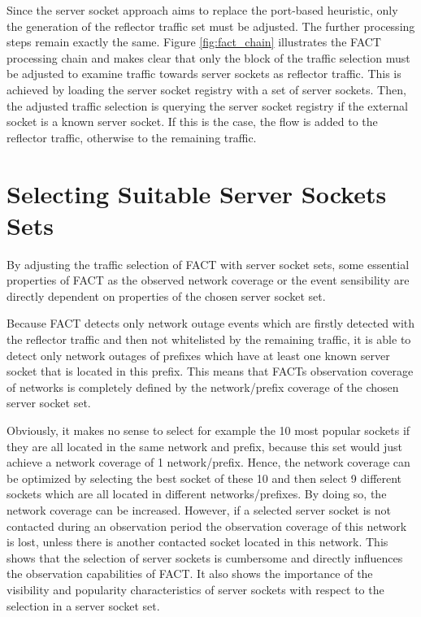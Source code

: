 Since the \gls{server socket} approach aims to replace the port-based heuristic, 
only the generation of the reflector traffic set must be adjusted. The further 
processing steps remain exactly the same. Figure \ref{fig:fact_chain} 
illustrates the \gls{FACT} processing chain and makes clear that only the block 
of the traffic selection must be adjusted to examine traffic towards 
\glspl{server socket} as reflector traffic. This is achieved by loading the 
\gls{server socket} registry with a set of \glspl{server socket}. Then, the 
adjusted traffic selection is querying the server socket registry if the 
external socket is a known \gls{server socket}. If this is the case, the flow is 
added to the reflector traffic, otherwise to the remaining traffic. 

\section{Selecting Suitable Server Sockets Sets\label{section:ses_selection}}
By adjusting the traffic selection of \gls{FACT} with \gls{server socket} sets, 
some essential properties of \gls{FACT} as the observed network coverage or the 
event sensibility are directly dependent on properties of the chosen 
\gls{server socket} set. 

Because \gls{FACT} detects only network outage events which are firstly detected 
with the reflector traffic and then not whitelisted by the remaining traffic, it 
is able to detect only network outages of prefixes which have at least one known 
server socket that is located in this prefix. This means that FACTs observation 
coverage of networks is completely defined by the network/prefix coverage of the 
chosen \gls{server socket} set. 

Obviously, it makes no sense to select for example the 10 most popular sockets 
if they are all located in the same network and prefix, because this set would 
just achieve a network coverage of 1 network/prefix. Hence, the network coverage 
can be optimized by selecting the best socket of these 10 and then select 9 
different sockets which are all located in different networks/prefixes. By doing 
so, the network coverage can be increased. However, if a selected 
\gls{server socket} is not contacted during an observation period the 
observation coverage of this network is lost, unless there is another contacted 
socket located in this network. 
This shows that the selection of \glspl{server socket} is cumbersome and 
directly influences the observation capabilities of FACT. It also shows the 
importance of the visibility and popularity characteristics of 
\glspl{server socket} with respect to the selection in a \gls{server socket} 
set. 

